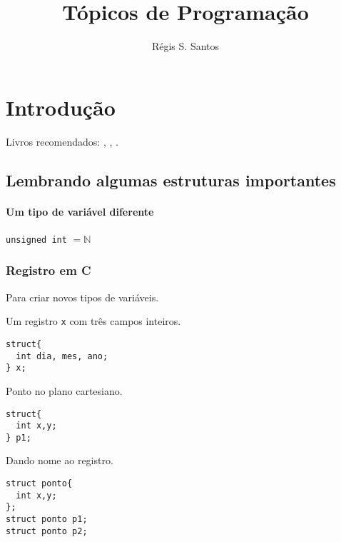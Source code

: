 \documentclass[a4paper]{memoir}
\title{T\'opicos de Programa\c c\~ao}
\author{R\'egis S. Santos}
\date{\the\year}
\begin{document}
\begin{titlingpage}
  \maketitle
\end{titlingpage}

\tableofcontents

\chapter{Introdução}

Livros recomendados: \cite[Cormen]{cormen2001introduction}, \cite[Varizani]{dasgupta2006algorithms}, \cite[Feofiloff]{feofiloff2009algoritmos}.

\section{Lembrando algumas estruturas importantes}

\subsubsection{Um tipo de variável diferente}

\verb|unsigned int| $= \mathbb N$

\subsection{Registro em C}

Para criar novos tipos de variáveis.

\begin{ex}
Um registro \verb|x| com três campos inteiros.

\begin{verbatim}
struct{
  int dia, mes, ano;
} x;
\end{verbatim}

\end{ex}

\begin{ex}
Ponto no plano cartesiano.

\begin{verbatim}
struct{
  int x,y;
} p1;
\end{verbatim}

\end{ex}

\begin{ex}
Dando nome ao registro.

\begin{verbatim}
struct ponto{
  int x,y;
};
struct ponto p1;
struct ponto p2;
\end{verbatim}

\end{ex}
\end{document}
